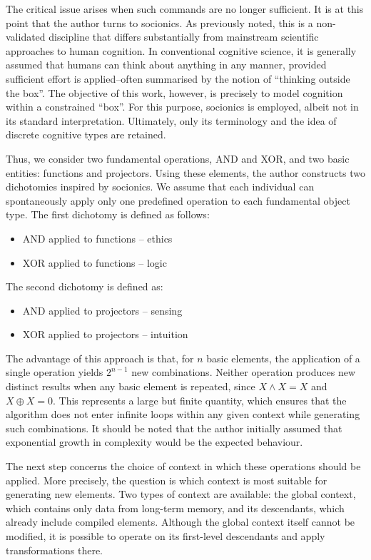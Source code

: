 \documentclass[12pt, a4paper]{article}
\begin{document}
The critical issue arises when such commands are no longer sufficient. It is at this point 
that the author turns to socionics. As previously noted, this is a non-validated discipline 
that differs substantially from mainstream scientific approaches to human cognition. In 
conventional cognitive science, it is generally assumed that humans can think about anything 
in any manner, provided sufficient effort is applied--often summarised by the notion of ``thinking 
outside the box''. The objective of this work, however, is precisely to model cognition 
within a constrained ``box''. For this purpose, socionics is employed, albeit not in its 
standard interpretation. Ultimately, only its terminology and the idea of discrete cognitive 
types are retained.

Thus, we consider two fundamental operations, AND and XOR, and two basic entities: functions 
and projectors. Using these elements, the author constructs two dichotomies inspired by socionics. 
We assume that each individual can spontaneously apply only one predefined operation to each 
fundamental object type. The first dichotomy is defined as follows:

\begin{itemize}
\item AND applied to functions -- ethics
\item XOR applied to functions -- logic
\end{itemize}

The second dichotomy is defined as:

\begin{itemize}
\item AND applied to projectors -- sensing
\item XOR applied to projectors -- intuition
\end{itemize}

The advantage of this approach is that, for $n$ basic elements, the application of a single 
operation yields $2^{n-1}$ new combinations. Neither operation produces new distinct results 
when any basic element is repeated, since $X \land X = X$ and $X \oplus X = 0$. This represents 
a large but finite quantity, which ensures that the algorithm does not enter infinite loops 
within any given context while generating such combinations. It should be noted that the author 
initially assumed that exponential growth in complexity would be the expected behaviour.

The next step concerns the choice of context in which these operations should be applied. 
More precisely, the question is which context is most suitable for generating new elements. 
Two types of context are available: the global context, which contains only data from long-term 
memory, and its descendants, which already include compiled elements. Although the global context 
itself cannot be modified, it is possible to operate on its first-level descendants and apply 
transformations there.
\end{document}
